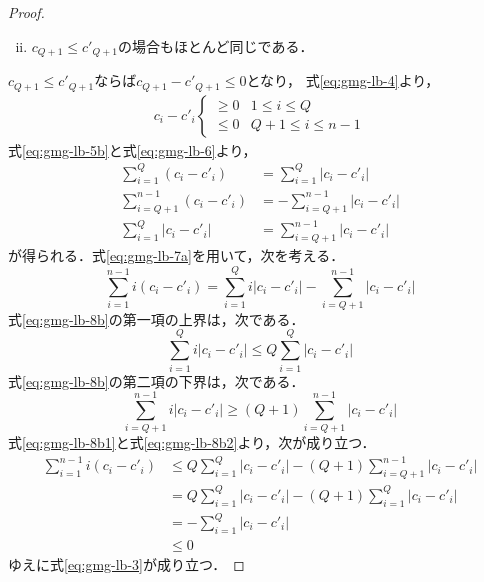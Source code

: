 \begin{proof}
  \begin{enumerate}[(i)]
    \setcounter{enumi}{1}
  \item $c_{Q+1}\leq c'_{Q+1}$の場合もほとんど同じである．
  \end{enumerate}
  $c_{Q+1}\leq c'_{Q+1}$ならば$c_{Q+1}-c'_{Q+1}\leq0$となり，
  式\ref{eq:gmg-lb-4}より，
  \begin{equation}
    \label{eq:gmg-lb-5b}
    \begin{aligned}
      c_i-c'_i
      \begin{cases}
        \geq 0 & 1\leq i\leq Q \\
        \leq 0 & Q+1\leq i\leq n-1
      \end{cases}
    \end{aligned}
  \end{equation}
  式\ref{eq:gmg-lb-5b}と式\ref{eq:gmg-lb-6}より，
  \begin{equation}
    \label{eq:gmg-lb-7b}
    \begin{aligned}
      \sum_{i=1}^{Q}(c_i-c'_i) &= \sum_{i=1}^{Q}|c_i-c'_i| \\
      \sum_{i=Q+1}^{n-1}(c_i-c'_i) &= -\sum_{i=Q+1}^{n-1}|c_i-c'_i| \\
      \sum_{i=1}^{Q}|c_i-c'_i| &= \sum_{i=Q+1}^{n-1}|c_i-c'_i|
    \end{aligned}
  \end{equation}
  が得られる．式\ref{eq:gmg-lb-7a}を用いて，次を考える．
  \begin{equation}
    \label{eq:gmg-lb-8b}
    \sum_{i=1}^{n-1}i(c_i-c'_i)=
    \sum_{i=1}^{Q}i|c_i-c'_i|-\sum_{i=Q+1}^{n-1}|c_i-c'_i|
  \end{equation}
  式\ref{eq:gmg-lb-8b}の第一項の上界は，次である．
  \begin{equation}
    \label{eq:gmg-lb-8b1}
    \sum_{i=1}^{Q}i|c_i-c'_i|\leq Q\sum_{i=1}^{Q}|c_i-c'_i|
  \end{equation}
  式\ref{eq:gmg-lb-8b}の第二項の下界は，次である．
  \begin{equation}
    \label{eq:gmg-lb-8b2}
    \sum_{i=Q+1}^{n-1}i|c_i-c'_i|\geq (Q+1)\sum_{i=Q+1}^{n-1}|c_i-c'_i|
  \end{equation}
  式\ref{eq:gmg-lb-8b1}と式\ref{eq:gmg-lb-8b2}より，次が成り立つ．
  \begin{align*}
    \sum_{i=1}^{n-1}i(c_i-c'_i)
    &\leq Q\sum_{i=1}^{Q}|c_i-c'_i|-(Q+1)\sum_{i=Q+1}^{n-1}|c_i-c'_i| \\
    &= Q\sum_{i=1}^{Q}|c_i-c'_i|-(Q+1)\sum_{i=1}^{Q}|c_i-c'_i| \\
    &= -\sum_{i=1}^{Q}|c_i-c'_i| \\
    &\leq 0
  \end{align*}
  ゆえに式\ref{eq:gmg-lb-3}が成り立つ．
\end{proof}

